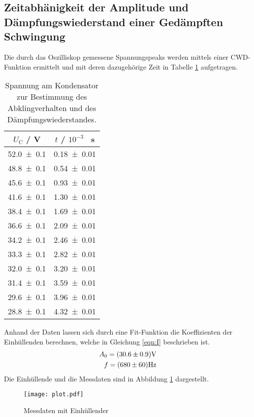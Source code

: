 \subsection{Zeitabhänigkeit der Amplitude und Dämpfungswiederstand einer Gedämpften Schwingung}
Die durch das Oszilliskop gemessene Spannungspeaks werden mittels einer CWD-Funktion ermittelt und mit deren dazugehörige Zeit in Tabelle \ref{tab:U_C} aufgetragen.
\begin{table}
  \centering
  \begin{tabular}{c c}
    \toprule
    	$U_\text{C}$ / V & $t$ / $10^{-3}$ \, s\\
    \midrule
    \num{52.0 +- 0.1}  	& \num{0.18 +- 0.01}	\\
    \num{48.8 +- 0.1}	& \num{0.54 +- 0.01}	\\
    \num{45.6 +- 0.1}	& \num{0.93 +- 0.01} 	\\
    \num{41.6 +- 0.1}	& \num{1.30 +- 0.01}	\\
    \num{38.4 +- 0.1}	& \num{1.69 +- 0.01}	\\
    \num{36.6 +- 0.1}	& \num{2.09 +- 0.01} 	\\
    \num{34.2 +- 0.1}	& \num{2.46 +- 0.01}	\\
    \num{33.3 +- 0.1} 	& \num{2.82 +- 0.01}	\\
    \num{32.0 +- 0.1} 	& \num{3.20 +- 0.01} 	\\
    \num{31.4 +- 0.1}	& \num{3.59 +- 0.01}	\\
    \num{29.6 +- 0.1}	& \num{3.96 +- 0.01}	\\
    \num{28.8 +- 0.1}	& \num{4.32 +- 0.01} 	\\
    \bottomrule
  \end{tabular}
  \caption{Spannung am Kondensator zur Bestimmung des Abklingverhalten und des Dämpfungswiederstandes.}
  \label{tab:U_C}
\end{table}
Anhand der Daten lassen sich durch eine Fit-Funktion die Koeffizienten der Einhüllenden berechnen, welche in Gleichung \ref{eqn:I} beschrieben ist.
\begin{eqnarray}
  A_0 = ( \num{30.6 +- 0.9} ) \text{V} \\
  f = ( \num{680 +- 60} ) \text{Hz}
  \label{eqn:Koef}
\end{eqnarray}
Die Einhüllende und die Messdaten sind in Abbildung \ref{fig:Osz} dargestellt.
\begin{figure}
  \centering
  \texttt{[image: plot.pdf]}
  \caption{Messdaten mit Einhüllender}
  \label{fig:Osz}
\end{figure}
